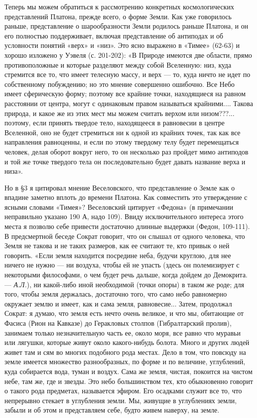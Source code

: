 Теперь мы можем обратиться к рассмотрению конкретных
космологических представлений Платона, прежде всего, о форме Земли.
Как уже говорилось раньше, представление о шарообразности Земли
родилось раньше Платона, и он его полностью поддерживает, включая
представление об антиподах и об условности понятий «верх» и «низ». Это
ясно выражено в «Тимее» (62-63) и хорошо изложено у Уэвеля (с.
201-202): «В Природе имеются две области, прямо противоположные и
которые разделяют между собой Вселенную: низ, куда стремится все то,
что имеет телесную массу, и верх --- то, куда ничто не идет по
собственному побуждению; но это мнение совершенно ошибочно. Все Небо
имеет сферическую форму; поэтому все крайние точки, находящиеся на
равном расстоянии от центра, могут с одинаковым правом называться
крайними.... Такова природа, и какое же из этих мест мы можем считать
верхом или низом???... поэтому, если принять твердое тело, находящееся
в равновесии в центре Вселенной, оно не будет стремиться ни к одной из
крайних точек, так как все направления равноценны, и если по этому
твердому телу будет перемещаться человек, делая оборот вокруг него, то
он несколько раз пройдет мимо антиподов и той же точке твердого тела
он последовательно будет давать название верха и низа».

Но в §3 я цитировал мнение Веселовского, что представление о Земле как
о впадине заметно вплоть до времени Платона. Как совместить это
утверждение с ясными словами «Тимея»? Веселовский цитирует «Федона» (в
примечании неправильно указано 190 А, надо 109). Ввиду исключительного
интереса этого места я позволю себе привести достаточно длинные
выдержки (Федон, 109-111). В предсмертной беседе Сократ говорит, что
он слышал от одного человека, что Земля не такова и не таких размеров,
как ее считают те, кто привык о ней говорить. «Если земля находится
посредине неба, будучи круглою, для нее ничего не нужно --- ни
воздуха, чтобы ей не упасть (здесь он полемизирует с некоторыми
философами, о чем будет речь дальше, когда дойдем до Демокрита. ---
\emph{А.Л.}), ни какой-либо иной необходимой (точки опоры) в таком же
роде; для того, чтобы земля держалась, достаточно того, что само небо
равномерно окружает землю и имеет, как и сама земля, равновесие...
Затем, продолжал Сократ: я думаю, что земля есть нечто очень великое,
и что мы, обитающие от Фасиса (Рион на Кавказе) до Геракловых столпов
(Гибралтарский пролив), занимаем только незначительную часть ее, около
моря, все равно что муравьи или лягушки, которые живут около
какого-нибудь болота. Много и других людей живет там и сям во многих
подобного рода местах. Дело в том, что повсюду на земле имеется
множество разнообразных, по форме и по величине, углублений, куда
собирается вода, туман и воздух. Сама же земля, чистая, покоится на
чистом небе, там же, где и звезды. Это небо большинством тех, кто
обыкновенно говорит о такого рода предметах, называется эфиром. Его
осадками служит все то, что непрерывно стекает в углубления земли. Мы,
живущие в углублениях земли, забыли и об этом и представляем себе,
будто живем наверху, на земле.


